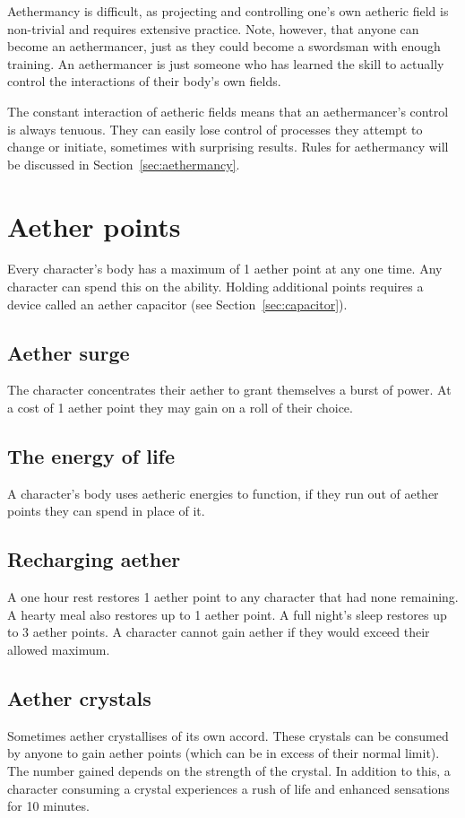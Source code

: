 \documentclass[a4paper,11pt,oneside]{book}
\newcommand{\textlf}[1]{\textbf{\titlecap{#1}}}
\begin{document}
Aethermancy is difficult, as projecting and controlling one's own aetheric field is non-trivial and requires extensive practice. Note, however, that anyone can become an aethermancer, just as they could become a swordsman with enough training. An aethermancer is just someone who has learned the skill to actually control the interactions of their body's own fields. 

The constant interaction of aetheric fields means that an aethermancer's control is always tenuous. They can easily lose control of processes they attempt to change or initiate, sometimes with surprising results. Rules for aethermancy will be discussed in Section~\ref{sec:aethermancy}.

\section{Aether points}
Every character's body has a maximum of 1 aether point at any one time. Any character can spend this on the \textlf{aether surge} ability. Holding additional points requires a device called an aether capacitor (see Section~\ref{sec:capacitor}).

\subsection{Aether surge}
The character concentrates their aether to grant themselves a burst of power. At a cost of 1 aether point they may gain \textlf{edge+} on a roll of their choice.

\subsection{The energy of life}
A character's body uses aetheric energies to function, if they run out of aether points they can spend \textlf{endurance} in place of it.

\subsection{Recharging aether}
A one hour rest restores 1 aether point to any character that had none remaining. A hearty meal also restores up to 1 aether point. A full night's sleep restores up to 3 aether points. A character cannot gain aether if they would exceed their allowed maximum.

\subsection{Aether crystals}
Sometimes aether crystallises of its own accord. These crystals can be consumed by anyone to gain aether points (which can be in excess of their normal limit). The number gained depends on the strength of the crystal. In addition to this, a character consuming a crystal experiences a rush of life and enhanced sensations for 10 minutes.
\end{document}
